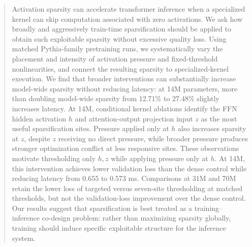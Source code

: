 \begin{abstract}
Activation sparsity can accelerate transformer inference when a specialized kernel can skip computation associated with zero activations. We ask how broadly and aggressively train-time sparsification should be applied to obtain such exploitable sparsity without excessive quality loss. Using matched Pythia-family pretraining runs, we systematically vary the placement and intensity of activation pressure and fixed-threshold nonlinearities, and connect the resulting sparsity to specialized-kernel execution. We find that broader interventions can substantially increase model-wide sparsity without reducing latency: at 14M parameters, more than doubling model-wide sparsity from 12.71\% to 27.48\% slightly increases latency. At 14M, conditional kernel ablations identify the FFN hidden activation \(h\) and attention-output projection input \(z\) as the most useful sparsification sites. Pressure applied only at \(h\) also increases sparsity at \(z\), despite \(z\) receiving no direct pressure, while broader pressure produces stronger optimization conflict at less responsive sites. These observations motivate thresholding only \(h,z\) while applying pressure only at \(h\). At 14M, this intervention achieves lower validation loss than the dense control while reducing latency from 0.655 to 0.573 ms. Comparisons at 31M and 70M retain the lower loss of targeted versus seven-site thresholding at matched thresholds, but not the validation-loss improvement over the dense control. Our results suggest that sparsification is best treated as a training--inference co-design problem: rather than maximizing sparsity globally, training should induce specific exploitable structure for the inference system.

\end{abstract}

